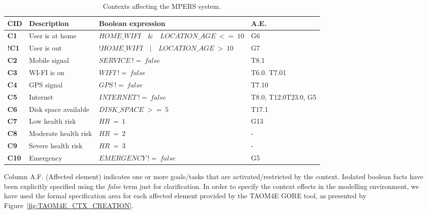 \begin{table}[h]
{\renewcommand{\arraystretch}{1.5}
\footnotesize
\begin{tabularx}{\textwidth}{@{}lllX@{}}
\toprule
\textbf{CID} & \textbf{Description} & \textbf{Boolean expression}                          	&\textbf{A.E.}\\ \midrule
\textbf{C1}  & User is at home      & $HOME\_WIFI\quad \&\quad LOCATION\_AGE\ <=\ 10$ 	&G6\\
\textbf{!C1}  & User is out         & $!HOME\_WIFI\quad |\quad LOCATION\_AGE\ >\ 10$	&G7\\
\textbf{C2}  & Mobile signal        & $SERVICE\ !=\ false$                           	&T8.1\\
\textbf{C3}  & WI-FI is on          & $WIFI\ !=\ false$                              	&T6.0. T7.01\\
\textbf{C4}  & GPS signal           & $GPS\ !=\ false$                               	&T7.10\\
\textbf{C5}  & Internet             & $INTERNET\ !=\ false$                          	&T8.0, T12.0\newline T23.0, G5\\
\textbf{C6}  & Disk space available & $DISK\_SPACE\ >=\ 5$                           	&T17.1\\
\textbf{C7}  & Low health risk      & $HR\ =\ 1$                                     	&G13\\
\textbf{C8}  & Moderate health risk & $HR\ =\ 2$                                     	&-\\
\textbf{C9}  & Severe health risk   & $HR\ =\ 3$                                     	&-\\
\textbf{C10} & Emergency            & $EMERGENCY\ !=\ false$                                         	&G5\\ \bottomrule
\end{tabularx}
\caption{Contexts affecting the MPERS system.}
\label{tab:MPERS_CTXS}
}
\end{table}
\normalsize

Column A.F. (Affected element) indicates one or more goals/tasks that are activated/restricted by the context. Isolated boolean facts have been explicitly specified using the \textit{false} term just for clarification. In order to specify the context effects in the modelling environment, we have used the formal specification area for each affected element provided by the TAOM4E GORE tool, as presented by Figure~\ref{fig:TAOM4E_CTX_CREATION}.

